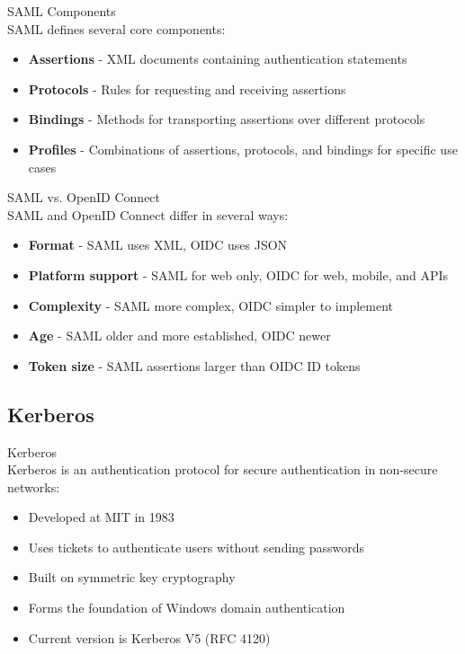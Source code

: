 \begin{concept}{SAML Components}\\
SAML defines several core components:
\begin{itemize}
    \item \textbf{Assertions} - XML documents containing authentication statements
    \item \textbf{Protocols} - Rules for requesting and receiving assertions
    \item \textbf{Bindings} - Methods for transporting assertions over different protocols
    \item \textbf{Profiles} - Combinations of assertions, protocols, and bindings for specific use cases
\end{itemize}
\end{concept}

\begin{concept}{SAML vs. OpenID Connect}\\
SAML and OpenID Connect differ in several ways:
\begin{itemize}
    \item \textbf{Format} - SAML uses XML, OIDC uses JSON
    \item \textbf{Platform support} - SAML for web only, OIDC for web, mobile, and APIs
    \item \textbf{Complexity} - SAML more complex, OIDC simpler to implement
    \item \textbf{Age} - SAML older and more established, OIDC newer
    \item \textbf{Token size} - SAML assertions larger than OIDC ID tokens
\end{itemize}
\end{concept}

\subsection{Kerberos}

\begin{definition}{Kerberos}\\
Kerberos is an authentication protocol for secure authentication in non-secure networks:
\begin{itemize}
    \item Developed at MIT in 1983
    \item Uses tickets to authenticate users without sending passwords
    \item Built on symmetric key cryptography
    \item Forms the foundation of Windows domain authentication
    \item Current version is Kerberos V5 (RFC 4120)
\end{itemize}
\end{definition}

